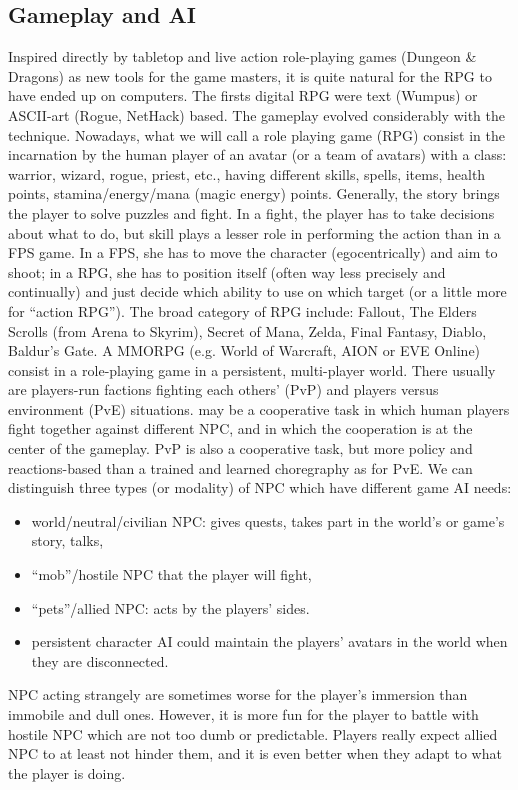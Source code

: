 \subsection{Gameplay and AI}
Inspired directly by tabletop and live action role-playing games (Dungeon \& Dragons) as new tools for the game masters, it is quite natural for the RPG to have ended up on computers. The firsts digital RPG were text (Wumpus) or ASCII-art (Rogue, NetHack) based. The gameplay evolved considerably with the technique. Nowadays, what we will call a role playing game (RPG) consist in the incarnation by the human player of an avatar (or a team of avatars) with a class: warrior, wizard, rogue, priest, etc., having different skills, spells, items, health points, stamina/energy/mana (magic energy) points. Generally, the story brings the player to solve puzzles and fight. In a fight, the player has to take decisions about what to do, but skill plays a lesser role in performing the action than in a FPS game. In a FPS, she has to move the character (egocentrically) and aim to shoot; in a RPG, she has to position itself (often way less precisely and continually) and just decide which ability to use on which target (or a little more for ``action RPG''). The broad category of RPG include: Fallout, The Elders Scrolls (from Arena to Skyrim), Secret of Mana, Zelda, Final Fantasy, Diablo, Baldur's Gate. A MMORPG (e.g. World of Warcraft, AION or EVE Online) consist in a role-playing game in a persistent, multi-player world. There usually are players-run factions fighting each others’ (PvP) and players versus environment (PvE) situations.  may be a cooperative task in which human players fight together against different NPC, and in which the cooperation is at the center of the gameplay. PvP is also a cooperative task, but more policy and reactions-based than a trained and learned choregraphy as for PvE. We can distinguish three types (or modality) of NPC which have different game AI needs:
\begin{itemize}
    \item world/neutral/civilian NPC: gives quests, takes part in the world's or game's story, talks,
    \item ``mob''/hostile NPC that the player will fight, 
    \item ``pets''/allied NPC: acts by the players' sides.
    \item persistent character AI could maintain the players' avatars in the world when they are disconnected.
\end{itemize}
NPC acting strangely are sometimes worse for the player's immersion than immobile and dull ones. However, it is more fun for the player to battle with hostile NPC which are not too dumb or predictable. Players really expect allied NPC to at least not hinder them, and it is even better when they adapt to what the player is doing. %

